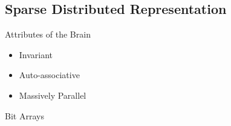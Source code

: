 
\subsection{Sparse Distributed Representation}


\begin{frame}[c]{Attributes of the Brain}
    \begin{itemize}[<+(1)->]
        \item Invariant
        \item Auto-associative
        \item Massively Parallel
    \end{itemize}
\end{frame}



\begin{frame}[c]{Bit Arrays}
    \Large
    \pause
\end{frame}


